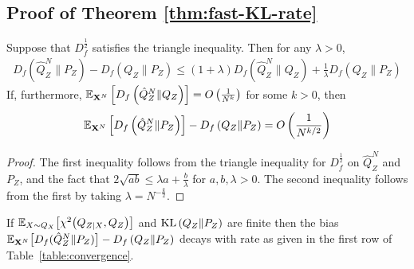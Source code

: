 \subsection{Proof of Theorem \ref{thm:fast-KL-rate}}\label{appendix:subsec:thm1}

\begin{lemma}\label{lemma:hilbertian-triangle}
Suppose that $D_f^{\frac{1}{2}}$ satisfies the triangle inequality.
Then for any $\lambda>0$,
\begin{align*}
    D_f\left(\hat{Q}^N_Z \| P_Z\right) - D_f\left(Q_{Z} \| P_Z\right) \leq (1+\lambda) D_f\left(\hat{Q}^N_Z \| Q_Z \right) +  \frac{1}{\lambda} D_f\left(Q_{Z} \| P_Z \right)
\end{align*}
If, furthermore, $\mathbb{E}_{\mathbf{X}^N}\left[ D_f\left(\hat{Q}^N_Z \| Q_Z\right)\right] = O\left( \frac{1}{N^k} \right)$ 
for some $k>0$, 
then
\begin{align*}
    \mathbb{E}_{\mathbf{X}^N}\left[ D_f\left(\hat{Q}^N_Z \| P_Z\right) \right] - D_f\left(Q_{Z} \| P_Z\right) = O\left( \frac{1}{N^{k/2}} \right)
\end{align*}
\end{lemma}
\begin{proof}
The first inequality follows from the triangle inequality for $D_f^{\frac{1}{2}}$ on $\hat{Q}^N_Z$ and $P_Z$, and the fact that $2\sqrt{ab} \leq \lambda a + \frac{b}{\lambda}$ for ${a, b, \lambda>0}$.
The second inequality follows from the first by taking $\lambda = N^{-\frac{k}{2}}$.
\end{proof}


\begin{theorem}
If
$\mathbb{E}_{X\sim Q_X}\bigl[\chi^2\bigl(Q_{Z|X}, Q_Z\bigr)\bigr]$ and
$\mathrm{KL}\left( Q_{Z} \| P_Z\right)$ are finite then the bias ${\mathbb{E}_{\mathbf{X}^N}\bigl[D_f( \hat{Q}_Z^N \| P_Z)\bigr] - D_f\left( Q_{Z} \| P_Z\right)}$ decays with rate as given in the first row of Table~\ref{table:convergence}.
\end{theorem}

